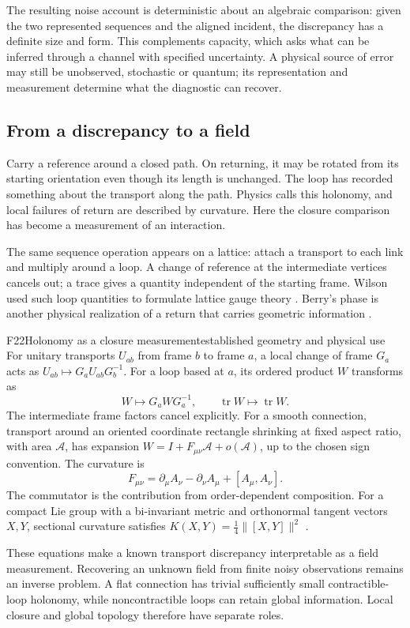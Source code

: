 \documentclass[11pt,a4paper]{article}
\DeclareMathOperator{\tr}{tr}
\begin{document}
The resulting noise account is deterministic about an algebraic comparison:
given the two represented sequences and the aligned incident, the discrepancy
has a definite size and form. This complements capacity, which asks what can
be inferred through a channel with specified uncertainty. A physical source
of error may still be unobserved, stochastic or quantum; its representation
and measurement determine what the diagnostic can recover.

\subsection{From a discrepancy to a field}
Carry a reference around a closed path. On returning, it may be rotated from
its starting orientation even though its length is unchanged. The loop has
recorded something about the transport along the path. Physics calls this
holonomy, and local failures of return are described by curvature. Here the
closure comparison has become a measurement of an interaction.

The same sequence operation appears on a lattice: attach a transport to each
link and multiply around a loop. A change of reference at the intermediate
vertices cancels out; a trace gives a quantity independent of the starting
frame. Wilson used such loop quantities to formulate lattice gauge theory
\citep{Wilson1974}. Berry's phase is another physical realization of a return
that carries geometric information \citep{Berry1984}.

\begin{formal}{F22}{Holonomy as a closure measurement}{established geometry and physical use}
For unitary transports $U_{ab}$ from frame $b$ to frame $a$, a local change
of frame $G_a$ acts as $U_{ab}\mapsto G_aU_{ab}G_b^{-1}$.
For a loop based at $a$, its ordered product $W$ transforms as
\begin{equation}
 W\mapsto G_aWG_a^{-1},\qquad \tr W\mapsto\tr W.
\end{equation}
The intermediate frame factors cancel explicitly. For a smooth connection,
transport around an oriented coordinate rectangle shrinking at fixed aspect
ratio, with area $\mathcal A$,
has expansion $W=I+F_{\mu\nu}\mathcal A+o(\mathcal A)$, up to the chosen
sign convention. The curvature is
\begin{equation}
 F_{\mu\nu}=\partial_\mu A_\nu-\partial_\nu A_\mu+[A_\mu,A_\nu].
\end{equation}
The commutator is the contribution from order-dependent composition.
For a compact Lie group with a bi-invariant metric and orthonormal tangent
vectors $X,Y$, sectional curvature satisfies
$K(X,Y)=\frac14\|[X,Y]\|^2$ \citep{Milnor1976}.

These equations make a known transport discrepancy interpretable as a field
measurement. Recovering an unknown field from finite noisy observations
remains an inverse problem. A flat connection has trivial sufficiently small
contractible-loop holonomy, while noncontractible loops can retain global
information. Local closure and global topology therefore have separate roles.
\end{formal}
\end{document}
